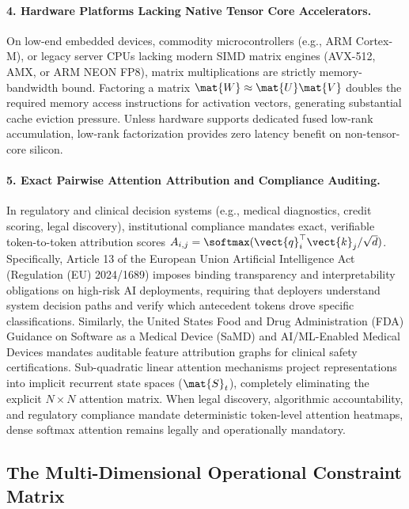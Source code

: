 \paragraph{4. Hardware Platforms Lacking Native Tensor Core Accelerators.}
On low-end embedded devices, commodity microcontrollers (e.g., ARM Cortex-M), or legacy server CPUs lacking modern SIMD matrix engines (AVX-512, AMX, or ARM NEON FP8), matrix multiplications are strictly memory-bandwidth bound. Factoring a matrix $\mat{W} \approx \mat{U}\mat{V}$ doubles the required memory access instructions for activation vectors, generating substantial cache eviction pressure. Unless hardware supports dedicated fused low-rank accumulation, low-rank factorization provides zero latency benefit on non-tensor-core silicon.

\paragraph{5. Exact Pairwise Attention Attribution and Compliance Auditing.}
In regulatory and clinical decision systems (e.g., medical diagnostics, credit scoring, legal discovery), institutional compliance mandates exact, verifiable token-to-token attribution scores $A_{i,j} = \softmax(\vect{q}_i^\top \vect{k}_j / \sqrt{d})$. Specifically, Article 13 of the European Union Artificial Intelligence Act (Regulation (EU) 2024/1689) imposes binding transparency and interpretability obligations on high-risk AI deployments, requiring that deployers understand system decision paths and verify which antecedent tokens drove specific classifications. Similarly, the United States Food and Drug Administration (FDA) Guidance on Software as a Medical Device (SaMD) and AI/ML-Enabled Medical Devices mandates auditable feature attribution graphs for clinical safety certifications. Sub-quadratic linear attention mechanisms project representations into implicit recurrent state spaces ($\mat{S}_t$), completely eliminating the explicit $N \times N$ attention matrix. When legal discovery, algorithmic accountability, and regulatory compliance mandate deterministic token-level attention heatmaps, dense softmax attention remains legally and operationally mandatory.

\subsection{The Multi-Dimensional Operational Constraint Matrix}
\label{sec:operational_constraint_matrix}

